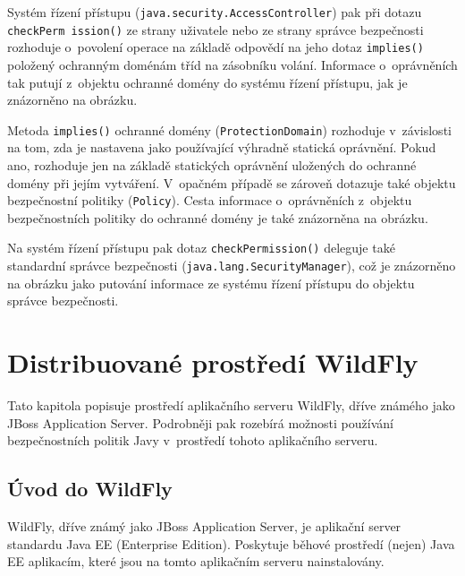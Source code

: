 Systém řízení přístupu ({\tt java.security.AccessController}) pak při dotazu {\tt checkPerm ission()} ze strany uživatele nebo ze strany správce bezpečnosti rozhoduje o~povolení operace na základě odpovědí na jeho dotaz {\tt implies()} položený ochranným doménám tříd na zásobníku volání.
Informace o~oprávněních tak putují z~objektu ochranné domény do systému řízení přístupu, jak je znázorněno na obrázku.

Metoda {\tt implies()} ochranné domény ({\tt ProtectionDomain}) rozhoduje v~závislosti na tom, zda je nastavena jako používající výhradně statická oprávnění.
Pokud ano, rozhoduje jen na základě statických oprávnění uložených do ochranné domény při jejím vytváření.
V~opačném případě se zároveň dotazuje také objektu bezpečnostní politiky ({\tt Policy}).
Cesta informace o~oprávněních z~objektu bezpečnostních politiky do ochranné domény je také znázorněna na obrázku.

Na systém řízení přístupu pak dotaz {\tt checkPermission()} deleguje také standardní správce bezpečnosti ({\tt java.lang.SecurityManager}), což je znázorněno na obrázku jako putování informace ze systému řízení přístupu do objektu správce bezpečnosti.


\chapter{Distribuované prostředí WildFly} \label{jboss}

Tato kapitola popisuje prostředí aplikačního serveru WildFly, dříve známého jako JBoss Application Server.
Podrobněji pak rozebírá možnosti používání bezpečnostních politik Javy v~prostředí tohoto aplikačního serveru.

\section{Úvod do WildFly} \label{uvodWildFly}

WildFly, dříve známý jako JBoss Application Server, je aplikační server standardu Java EE (Enterprise Edition).
Poskytuje běhové prostředí (nejen) Java EE aplikacím, které jsou na tomto aplikačním serveru nainstalovány.
\cite{wildflyRename}

